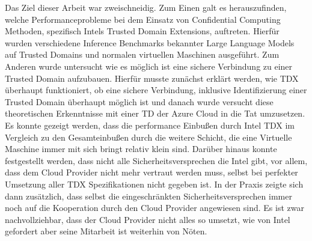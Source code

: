 
\Abstract
Das Ziel dieser Arbeit war zweischneidig. Zum Einen galt es herauszufinden, welche Performanceprobleme bei dem Einsatz von Confidential Computing Methoden, spezifisch Intels Trusted Domain Extensions, auftreten. Hierfür wurden verschiedene Inference Benchmarks bekannter Large Language Models auf Trusted Domains und normalen virtuellen Maschinen ausgeführt. Zum Anderen wurde untersucht wie es möglich ist eine sichere Verbindung zu einer Trusted Domain aufzubauen. Hierfür musste zunächst erklärt werden, wie TDX überhaupt funktioniert, ob eine sichere Verbindung, inklusive Identifizierung einer Trusted Domain überhaupt möglich ist und danach wurde versucht diese theoretischen Erkenntnisse mit einer TD der Azure Cloud in die Tat umzusetzen. Es konnte gezeigt werden, dass die performance Einbußen durch Intel TDX im Vergleich zu den Gesamteinbußen durch die weitere Schicht, die eine Virtuelle Maschine immer mit sich bringt relativ klein sind. Darüber hinaus konnte festgestellt werden, dass nicht alle Sicherheitsversprechen die Intel gibt, vor allem, dass dem Cloud Provider nicht mehr vertraut werden muss, selbst bei perfekter Umsetzung aller TDX Spezifikationen nicht gegeben ist. In der Praxis zeigte sich dann zusätzlich, dass selbst die eingeschränkten Sicherheitsversprechen immer noch auf die Kooperation durch den Cloud Provider angewiesen sind. Es ist zwar nachvollziehbar, dass der Cloud Provider nicht alles so umsetzt, wie von Intel gefordert aber seine Mitarbeit ist weiterhin von Nöten.